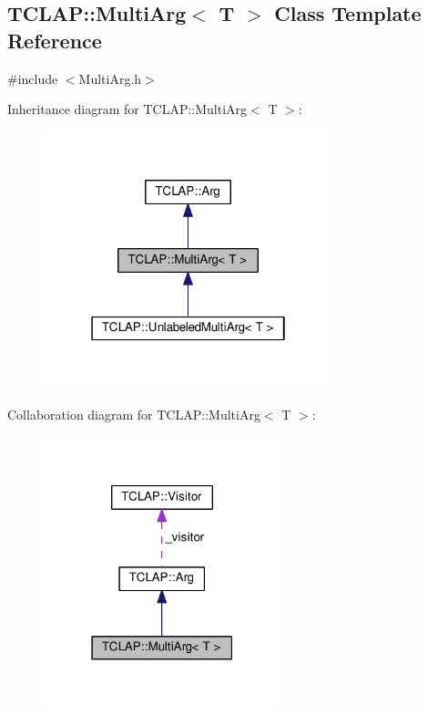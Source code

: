 \hypertarget{classTCLAP_1_1MultiArg}{}\subsection{T\+C\+L\+AP\+:\+:Multi\+Arg$<$ T $>$ Class Template Reference}
\label{classTCLAP_1_1MultiArg}


{\ttfamily \#include $<$Multi\+Arg.\+h$>$}



Inheritance diagram for T\+C\+L\+AP\+:\+:Multi\+Arg$<$ T $>$\+:
\nopagebreak
\begin{figure}[H]
\begin{center}
\leavevmode
\includegraphics[width=238pt]{classTCLAP_1_1MultiArg__inherit__graph}
\end{center}
\end{figure}


Collaboration diagram for T\+C\+L\+AP\+:\+:Multi\+Arg$<$ T $>$\+:
\nopagebreak
\begin{figure}[H]
\begin{center}
\leavevmode
\includegraphics[width=195pt]{classTCLAP_1_1MultiArg__coll__graph}
\end{center}
\end{figure}

